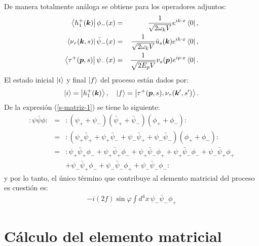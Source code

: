 De manera totalmente análoga se obtiene para los operadores adjuntos:
\begin{eqnarray}\label{accion-operadores-campos-2}
\left<h_1^+(\boldsymbol{k})\right|\phi_-(x)&=&\frac{1}{\sqrt{2\omega_kV}}e^{ik\cdot x}\left<0\right|, \nonumber \\
\left<\nu_\tau(\boldsymbol{k},s)\right|\Bar{\psi}_-(x)&=&\frac{1}{\sqrt{2\omega_kV}}\Bar{u}_s(\boldsymbol{k})e^{ik\cdot x}\left<0\right|, \nonumber \\
\left<\tau^+(\boldsymbol{p},s)\right|\psi_-(x)&=&\frac{1}{\sqrt{2E_pV}}v_s(\boldsymbol{p})e^{ip\cdot x}\left<0\right|.
\end{eqnarray}
El estado inicial $\left|i\right\rangle$ y final $\left|f\right\rangle$ del proceso están dados por:
\begin{eqnarray*}
\left|i\right\rangle=\left|h_1^+(\boldsymbol{k})\right\rangle, \quad \left|f\right\rangle=\left|\tau^+(\boldsymbol{p},s),\nu_\tau(\boldsymbol{k}',s')\right\rangle.
\end{eqnarray*}
De la expresión (\ref{s-matriz-1}) se tiene lo siguiente:
\begin{eqnarray*}
:\psi\bar{\psi}\phi:&=&:(\psi_++\psi_-)(\bar{\psi}_++\bar{\psi}_-)(\phi_++\phi_-): \\
&=&:(\psi_+\bar{\psi}_+ +\psi_+\bar{\psi}_- +\psi_-\bar{\psi}_+ +\psi_-\bar{\psi}_-)(\phi_++\phi_-): \\
&=&:\psi_+\bar{\psi}_+\phi_- +\psi_+\bar{\psi}_+\phi_- +\psi_+\bar{\psi}_-\phi_+ + \psi_+\bar{\psi}_-\phi_- +
\psi_-\bar{\psi}_+\phi_+ \\
& & +\psi_-\bar{\psi}_+\phi_- +\psi_-\bar{\psi}_-\phi_+ +\psi_-\bar{\psi}_-\phi_-:
\end{eqnarray*}
y por lo tanto, el único término que contribuye al elemento matricial del proceso es cuestión es:
\begin{eqnarray*}
-i(2f)\sin\varphi\int d^4x\,\psi_-\bar{\psi}_-\phi_+
\end{eqnarray*}

\section{Cálculo del elemento matricial}

